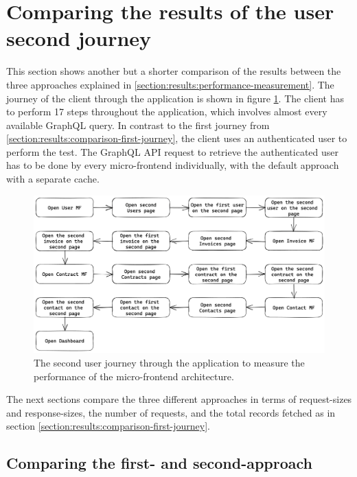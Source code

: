 \section{Comparing the results of the user second journey}\label{section:results:comparison-second-journey}

This section shows another but a shorter comparison of the results between the three approaches explained in \ref{section:results:performance-measurement}. The journey of the client through the application is shown in figure \ref{fig:results:evaluation-second-path}. The client has to perform 17 steps throughout the application, which involves almost every available GraphQL query. In contrast to the first journey from \ref{section:results:comparison-first-journey}, the client uses an authenticated user to perform the test. The GraphQL \ac{API} request to retrieve the authenticated user has to be done by every micro-frontend individually, with the default approach with a separate cache.

\ifshowImages
\begin{figure}[H]
\centering
\includegraphics[width=1\linewidth]{images/results/evaluation-second-path.png}
\caption{The second user journey through the application to measure the performance of the micro-frontend architecture.}\label{fig:results:evaluation-second-path}
\end{figure}
\fi

\noindent The next sections compare the three different approaches in terms of request-sizes and response-sizes, the number of requests, and the total records fetched as in section \ref{section:results:comparison-first-journey}.

\subsection{Comparing the first- and second-approach}\label{subsection:results:comparison-second-path-first-second-approach}

